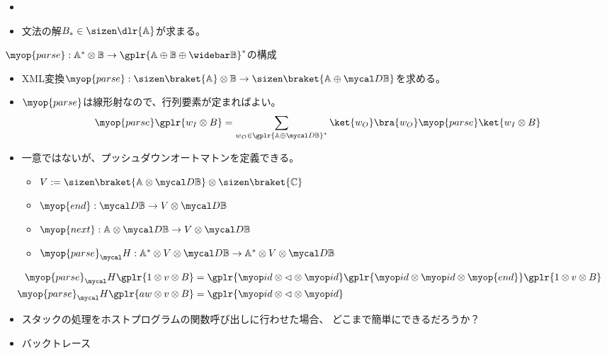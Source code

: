 {\begin{itemize}
		\item 
		\item 文法の解$B_*\in\sizen\dlr{\setA}$が求まる。
	\end{itemize} %
	$\myop{parse}: \setA^*\otimes\setB
	\to \gplr{\setA\oplus\setB\oplus\wbar{\setB}}^*$の構成
	\begin{itemize}\setlength{\itemsep}{-1mm} %
		\item XML変換$\myop{parse}:\sizen\braket{\setA}\otimes\setB
		\to\sizen\braket{\setA\oplus\D\setB}$を求める。
		\item $\myop{parse}$は線形射なので、行列要素が定まればよい。
		\begin{equation*}\begin{split}
			\myop{parse}\gplr{w_I\otimes B} 
			= \sum_{w_O\in\gplr{\setA\oplus\D\setB}^*}
			\ket{w_O}\bra{w_O}\myop{parse}\ket{w_I\otimes B}
		\end{split}\end{equation*}
		\item 一意ではないが、プッシュダウンオートマトンを定義できる。
		\begin{itemize}\setlength{\itemsep}{-1mm} %
			\item $V:=\sizen\braket{\setA\otimes\D\setB}
			\otimes\sizen\braket{\setC}$
			\item $\myop{end}:\D\setB\to V\otimes\D\setB$
			\item $\myop{next}:\setA\otimes\D\setB\to V\otimes\D\setB$
			\item $\myop{parse}_\Eta:\setA^*\otimes V\otimes\D\setB
			\to \setA^*\otimes V\otimes\D\setB$
		\end{itemize} %
	\end{itemize} %
	\begin{equation*}\begin{split}
		\myop{parse}_\Eta\gplr{1\otimes v\otimes B}
		&= \gplr{\id\otimes \lhd\otimes \id}
		\gplr{\id\otimes\id\otimes \myop{end}}
		\gplr{1\otimes v\otimes B} \\
		\myop{parse}_\Eta\gplr{aw\otimes v\otimes B}
		&= \gplr{\id\otimes \lhd\otimes \id}
	\end{split}\end{equation*}
	\begin{itemize}\setlength{\itemsep}{-1mm} %
		\item スタックの処理をホストプログラムの関数呼び出しに行わせた場合、
		どこまで簡単にできるだろうか？
		\item バックトレース
	\end{itemize} %
}

